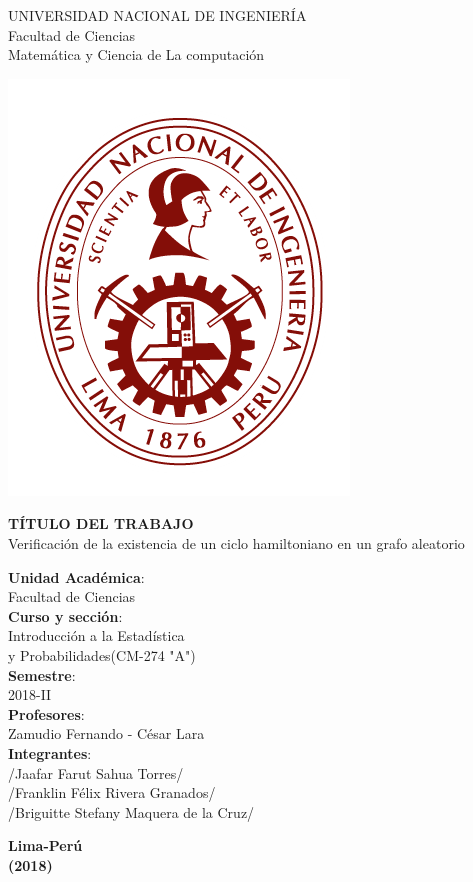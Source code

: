 \documentclass[11pt,a4paper]{article}
\begin{document}
\begin{center}
\LARGE \noindent UNIVERSIDAD NACIONAL DE INGENIERÍA\\
Facultad de Ciencias\\
Matemática y Ciencia de La computaci{\'o}n
\end{center}
\begin{center}
\begin{minipage}[c]{9cm}
\includegraphics[scale=1.00]{uni.PNG}
\end{minipage}
\end{center}
\begin{center}
\Large \textbf{T{\'I}TULO DEL TRABAJO}\\
Verificaci{\'o}n de la existencia de un ciclo hamiltoniano en un grafo aleatorio
\end{center}
\begin{center}
\Large \textbf{Unidad Acad{\'e}mica}: 
\\Facultad de Ciencias\\
\textbf{Curso y secci{\'o}n}: 
\\Introducci{\'o}n a la Estad{\'i}stica\\ y Probabilidades(CM-274 "A")\\
\textbf{Semestre}: 
\\2018-II\\
\textbf{Profesores}:
\\ Zamudio Fernando - C{\'e}sar Lara\\
\textbf{Integrantes}:\\
/Jaafar Farut Sahua Torres/\\
/Franklin F{\'e}lix Rivera Granados/\\
/Briguitte Stefany Maquera de la Cruz/\\
\end{center}
\begin{center}
\LARGE \vfill\textbf{Lima-Per{\'u}}\\
\textbf{(2018)}
\end{center}
\end{document}
